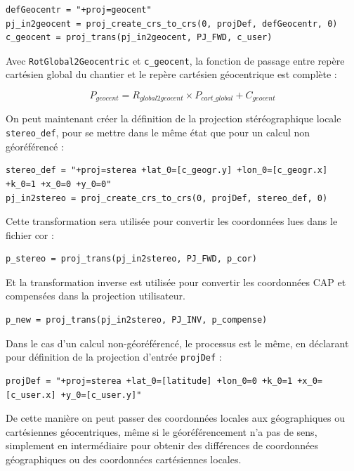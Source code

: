 \documentclass[french]{report}
\begin{document}
\begin{verbatim}
defGeocentr = "+proj=geocent"
pj_in2geocent = proj_create_crs_to_crs(0, projDef, defGeocentr, 0)
c_geocent = proj_trans(pj_in2geocent, PJ_FWD, c_user)
\end{verbatim}

Avec \texttt{RotGlobal2Geocentric} et \texttt{c\_geocent}, la fonction de passage entre repère cartésien global du chantier et le repère cartésien géocentrique est complète :

$$ P_{geocent} = R_{global2geocent} \times P_{cart\_global} + C_{geocent}$$

On peut maintenant créer la définition de la projection stéréographique locale \texttt{stereo\_def}, pour se mettre dans le même état que pour un calcul non géoréférencé :

\begin{verbatim}
stereo_def = "+proj=sterea +lat_0=[c_geogr.y] +lon_0=[c_geogr.x] +k_0=1 +x_0=0 +y_0=0"
pj_in2stereo = proj_create_crs_to_crs(0, projDef, stereo_def, 0)
\end{verbatim}

Cette transformation sera utilisée pour convertir les coordonnées lues dans le fichier cor :

\begin{verbatim}
p_stereo = proj_trans(pj_in2stereo, PJ_FWD, p_cor)
\end{verbatim}

Et la transformation inverse est utilisée pour convertir les coordonnées CAP et compensées dans la projection utilisateur.

\begin{verbatim}
p_new = proj_trans(pj_in2stereo, PJ_INV, p_compense)
\end{verbatim}

Dans le cas d'un calcul non-géoréférencé, le processus est le même,
en déclarant pour définition de la projection d'entrée \texttt{projDef} :

\begin{verbatim}
projDef = "+proj=sterea +lat_0=[latitude] +lon_0=0 +k_0=1 +x_0=[c_user.x] +y_0=[c_user.y]"
\end{verbatim}

De cette manière on peut passer des coordonnées locales aux géographiques ou cartésiennes géocentriques,
même si le géoréférencement n'a pas de sens, simplement en intermédiaire pour obtenir des différences de
coordonnées géographiques ou des coordonnées cartésiennes locales.
\end{document}
